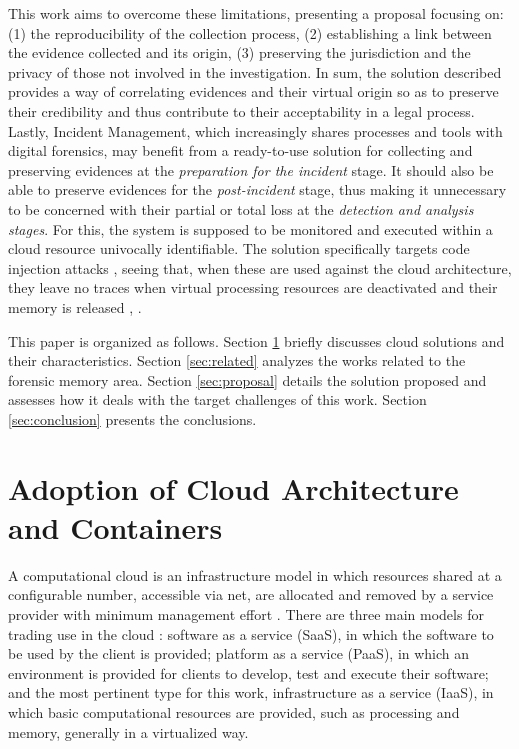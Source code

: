 \documentclass[conference]{IEEEtran}
\begin{document}
%
This work aims to overcome these limitations, presenting a proposal focusing on: (1) the reproducibility of the collection process, (2) establishing a link between the evidence collected and its origin, (3) preserving the jurisdiction and the privacy of those not involved in the investigation.
%
In sum, the solution described provides a way of correlating evidences and their virtual origin so as to preserve their credibility and thus contribute to their acceptability in a legal process.
%
Lastly, Incident Management, which increasingly shares processes and tools with digital forensics, may benefit from a ready-to-use solution for collecting and preserving evidences at the \textit{preparation for the incident} stage. It should also be able to preserve evidences for the \textit{post-incident} stage, thus making it unnecessary to be concerned with their partial or total loss at the \textit{detection and analysis stages}.
%
For this, the system is supposed to be monitored and executed within a cloud resource univocally identifiable.
%
The solution specifically targets code injection attacks \cite{Case_Memory_Forensics:2014}, seeing that, when these are used against the cloud architecture, they leave no traces when virtual processing resources are deactivated and their memory is released \cite{Vomel_Memory_Acquisition:2013}, \cite{Case_Memory_Forensics:2014}.
%


This paper is organized as follows.
%
Section \ref{sec:cloud} briefly discusses cloud solutions and their characteristics.
%
Section \ref{sec:related} analyzes the works related to the forensic memory area.
%
Section \ref{sec:proposal} details the solution proposed and assesses how it deals with the target challenges of this work. 
%
Section \ref{sec:conclusion} presents the conclusions.



\section{Adoption of Cloud Architecture and Containers}
\label{sec:cloud}


A computational cloud is an infrastructure model in which resources shared at a configurable number, accessible via net, are allocated and removed by a service provider with minimum management effort \cite{NIST2011}.
%
There are three main models for trading use in the cloud \cite{NIST2011}: software as a service (SaaS), in which the software to be used by the client is provided; platform as a service (PaaS), in which an environment is provided for clients to develop, test and execute their software; and the most pertinent type for this work, infrastructure as a service (IaaS), in which basic computational resources are provided, such as processing and memory, generally in a virtualized way.
\end{document}
